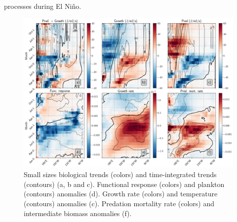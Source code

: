 processes during El Niño.  

\begin{figure}[h!tp]
	\centering
	\includegraphics[scale=0.4]{figs/fig8.png}	
	\caption{Small sizes biological trends (colors) and time-integrated trends (contours) (a, b and c). Functional response (colors) and plankton (contours) anomalies (d). Growth rate (colors) and temperature (contours) anomalies (c). Predation mortality rate (colors) and intermediate biomass anomalies (f).}
	\label{fig:fig8}
\end{figure}

